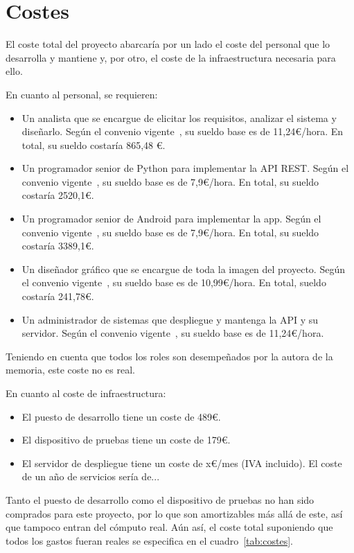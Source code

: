 \section{Costes}
\label{sec:costes}

El coste total del proyecto abarcaría por un lado el coste del personal que
lo desarrolla y mantiene y, por otro, el coste de la infraestructura necesaria
para ello.

En cuanto al personal, se requieren:
\begin{itemize}
\item Un analista que se encargue de elicitar los requisitos, analizar el
  sistema y diseñarlo. Según el convenio vigente~\cite{convenio}, su sueldo base
  es de 11,24€/hora. En total, su sueldo costaría 865,48 €.
\item Un programador senior de Python para implementar la API REST. Según el
  convenio vigente~\cite{convenio}, su sueldo base es de 7,9€/hora. En total, su
  sueldo costaría 2520,1€.
\item Un programador senior de Android para implementar la app. Según el
  convenio vigente~\cite{convenio}, su sueldo base es de 7,9€/hora. En total, su
  sueldo costaría 3389,1€.
\item Un diseñador gráfico que se encargue de toda la imagen del proyecto. Según
  el convenio vigente~\cite{convenio}, su sueldo base es de 10,99€/hora. En
  total, sueldo costaría 241,78€.
\item Un administrador de sistemas que despliegue y mantenga la API y su
  servidor. Según el convenio vigente~\cite{convenio}, su sueldo base es de
  11,24€/hora. 
\end{itemize}

Teniendo en cuenta que todos los roles son desempeñados por la autora de la
memoria, este coste no es real.

En cuanto al coste de infraestructura:
\begin{itemize}
\item El puesto de desarrollo tiene un coste de 489€.
\item El dispositivo de pruebas tiene un coste de 179€.
\item El servidor de despliegue tiene un coste de x€/mes (IVA incluido). El coste
  de un año de servicios sería de...
\end{itemize}

Tanto el puesto de desarrollo como el dispositivo de pruebas no han sido
comprados para este proyecto, por lo que son amortizables más allá de este, así
que tampoco entran del cómputo real. Aún así, el coste total suponiendo que todos
los gastos fueran reales se especifica en el cuadro~\ref{tab:costes}.

